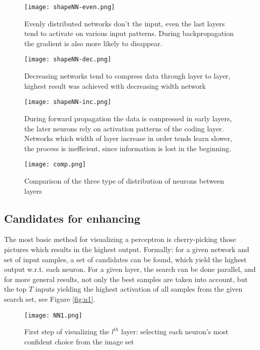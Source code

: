 \begin{figure}
    \centering
    \texttt{[image: shapeNN-even.png]}
    \caption{Evenly distributed networks don't the input, even the last layers tend to activate on various input patterns. During backpropagation the gradient is also more likely to disappear.}
    \label{fig:even}
\end{figure}
\begin{figure}
    \centering
    \texttt{[image: shapeNN-dec.png]}
    \caption{Decreasing networks tend to compress data through layer to layer, highest result was achieved with decreasing width network}
    \label{fig:dec}
\end{figure}
\begin{figure}
    \centering
    \texttt{[image: shapeNN-inc.png]}
    \caption{During forward propagation the data is compressed in early layers, the later neurons rely on activation patterns of the coding layer. Networks which width of layer increase in order tends learn slower, the process is inefficient, since information is lost in the beginning.}
    \label{fig:inc}
\end{figure}

\begin{figure}
    \centering
    \texttt{[image: comp.png]}
    \caption{Comparison of the three type of distribution of neurons between layers}
    \label{fig:comp}
\end{figure}


\subsection{Candidates for enhancing}
\label{method}
The most basic method for visualizing a perceptron is cherry-picking those pictures which results in the highest output.
Formally: for a given network and set of input samples, a set of candidates can be found, which yield the highest output w.r.t. each neuron. 
For a given layer, the search can be done parallel, and for more general results, not only the best samples are taken into account, but the top $T$ inputs yielding the highest activation of all samples from the given search set, see Figure \ref{fig:n1}. 
\begin{figure}
    \centering
    \texttt{[image: NN1.png]}
    \caption{First step of visualizing the $l^{th}$ layer: selecting each neuron's most confident choice from the image set}
    \label{fig:ga-method1}
\end{figure}

